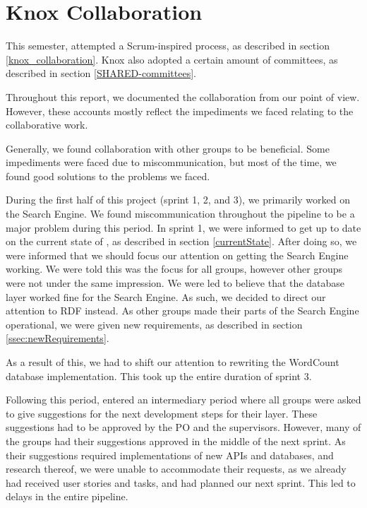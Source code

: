 \section{Knox Collaboration}
This semester, \knox{} attempted a Scrum-inspired process, as described in section \ref{knox_collaboration}. Knox also adopted a certain amount of committees, as described in section \ref{SHARED-committees}.

Throughout this report, we documented the \knox{} collaboration from our point of view. However, these accounts mostly reflect the impediments we faced relating to the collaborative work.

Generally, we found collaboration with other groups to be beneficial. Some impediments were faced due to miscommunication, but most of the time, we found good solutions to the problems we faced.

During the first half of this project (sprint 1, 2, and 3), we primarily worked on the Search Engine. We found miscommunication throughout the pipeline to be a major problem during this period. In sprint 1, we were informed to get up to date on the current state of \knox{}, as described in section \ref{currentState}. After doing so, we were informed that we should focus our attention on getting the Search Engine working. We were told this was the focus for all groups, however other groups were not under the same impression. We were led to believe that the database layer worked fine for the Search Engine. As such, we decided to direct our attention to RDF instead. As other groups made their parts of the Search Engine operational, we were given new requirements, as described in section \ref{ssec:newRequirements}.

As a result of this, we had to shift our attention to rewriting the WordCount database implementation. This took up the entire duration of sprint 3.

Following this period, \knox{} entered an intermediary period where all groups were asked to give suggestions for the next development steps for their layer. These suggestions had to be approved by the \knox{} PO and the \knox{} supervisors. However, many of the groups had their suggestions approved in the middle of the next sprint. As their suggestions required implementations of new APIs and databases, and research thereof, we were unable to accommodate their requests, as we already had received user stories and tasks, and had planned our next sprint. This led to delays in the entire pipeline.


